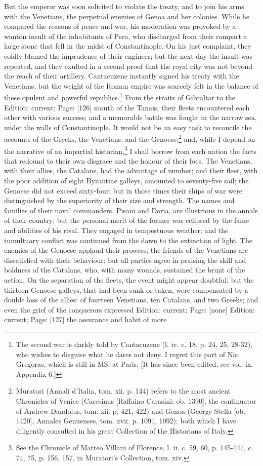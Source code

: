 But the emperor was soon solicited to violate the treaty, and to join his arms with the Venetians, the perpetual enemies of Genoa and her colonies. While he compared the reasons of peace and war, his moderation was provoked by a wanton insult of the inhabitants of Pera, who discharged from their rampart a large stone that fell in the midst of Constantinople. On his just complaint, they coldly blamed the imprudence of their engineer; but the next day the insult was repeated, and they exulted in a second proof that the royal city was not beyond the reach of their artillery. Cantacuzene instantly signed his treaty with the Venetians; but the weight of the Roman empire was scarcely felt in the balance of these opulent and powerful republics.\footnote{The second war is darkly told by Cantacuzene (l. iv. c. 18, p. 24, 25, 28-32), who wishes to disguise what he dares not deny. I regret this part of Nic. Gregoras, which is still in MS. at Paris. [It has since been edited, see vol. ix. Appendix 6.]} From the straits of Gibraltar to the Edition: current; Page: [126] mouth of the Tanais, their fleets encountered each other with various success; and a memorable battle was fought in the narrow sea, under the walls of Constantinople. It would not be an easy task to reconcile the accounts of the Greeks, the Venetians, and the Genoese;\footnote{Muratori (Annali d\texthebrew{}’Italia, tom. xii. p. 144) refers to the most ancient Chronicles of Venice (Caresinus [Raffaino Carasini; ob. 1390], the continuator of Andrew Dandolus, tom. xii. p. 421, 422) and Genoa (George Stella [ob. 1420], Annales Genuenses, tom. xvii. p. 1091, 1092); both which I have diligently consulted in his great Collection of the Historians of Italy.} and, while I depend on the narrative of an impartial historian,\footnote{See the Chronicle of Matteo Villani of Florence, l. ii. c. 59, 60, p. 145-147, c. 74, 75, p. 156, 157, in Muratori\texthebrew{}’s Collection, tom. xiv.} I shall borrow from each nation the facts that redound to their own disgrace and the honour of their foes. The Venetians, with their allies, the Catalans, had the advantage of number; and their fleet, with the poor addition of eight Byzantine galleys, amounted to seventy-five sail; the Genoese did not exceed sixty-four; but in those times their ships of war were distinguished by the superiority of their size and strength. The names and families of their naval commanders, Pisani and Doria, are illustrious in the annals of their country; but the personal merit of the former was eclipsed by the fame and abilities of his rival. They engaged in tempestuous weather; and the tumultuary conflict was continued from the dawn to the extinction of light. The enemies of the Genoese applaud their prowess; the friends of the Venetians are dissatisfied with their behaviour; but all parties agree in praising the skill and boldness of the Catalans, who, with many wounds, sustained the brunt of the action. On the separation of the fleets, the event might appear doubtful; but the thirteen Genoese galleys, that had been sunk or taken, were compensated by a double loss of the allies: of fourteen Venetians, ten Catalans, and two Greeks; and even the grief of the conquerors expressed Edition: current; Page: [none] Edition: current; Page: [127] the assurance and habit of more 